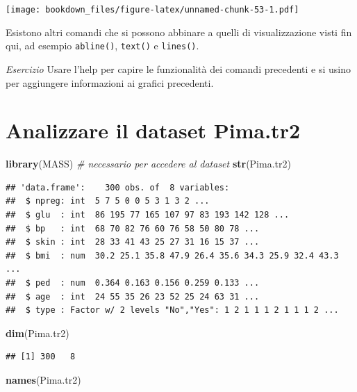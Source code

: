 \documentclass[]{book}
\newenvironment{Shaded}{\begin{snugshade}}{\end{snugshade}}
\newcommand{\CommentTok}[1]{\textcolor[rgb]{0.56,0.35,0.01}{\textit{#1}}}
\newcommand{\KeywordTok}[1]{\textcolor[rgb]{0.13,0.29,0.53}{\textbf{#1}}}
\newcommand{\NormalTok}[1]{#1}
\begin{document}
\texttt{[image: bookdown\_files/figure-latex/unnamed-chunk-53-1.pdf]}

Esistono altri comandi che si possono abbinare a quelli di visualizzazione visti fin qui, ad esempio \texttt{abline()}, \texttt{text()} e \texttt{lines()}.

\emph{Esercizio} Usare l'help per capire le funzionalità dei comandi precedenti e si usino per aggiungere informazioni ai grafici precedenti.

\hypertarget{analizzare-il-dataset-pima.tr2}{%
\section{Analizzare il dataset Pima.tr2}\label{analizzare-il-dataset-pima.tr2}}

\begin{Shaded}
\begin{Highlighting}[]
\KeywordTok{library}\NormalTok{(MASS) }\CommentTok{# necessario per accedere al dataset}
\KeywordTok{str}\NormalTok{(Pima.tr2)}
\end{Highlighting}
\end{Shaded}

\begin{verbatim}
## 'data.frame':    300 obs. of  8 variables:
##  $ npreg: int  5 7 5 0 0 5 3 1 3 2 ...
##  $ glu  : int  86 195 77 165 107 97 83 193 142 128 ...
##  $ bp   : int  68 70 82 76 60 76 58 50 80 78 ...
##  $ skin : int  28 33 41 43 25 27 31 16 15 37 ...
##  $ bmi  : num  30.2 25.1 35.8 47.9 26.4 35.6 34.3 25.9 32.4 43.3 ...
##  $ ped  : num  0.364 0.163 0.156 0.259 0.133 ...
##  $ age  : int  24 55 35 26 23 52 25 24 63 31 ...
##  $ type : Factor w/ 2 levels "No","Yes": 1 2 1 1 1 2 1 1 1 2 ...
\end{verbatim}

\begin{Shaded}
\begin{Highlighting}[]
\KeywordTok{dim}\NormalTok{(Pima.tr2)}
\end{Highlighting}
\end{Shaded}

\begin{verbatim}
## [1] 300   8
\end{verbatim}

\begin{Shaded}
\begin{Highlighting}[]
\KeywordTok{names}\NormalTok{(Pima.tr2)}
\end{Highlighting}
\end{Shaded}
\end{document}
